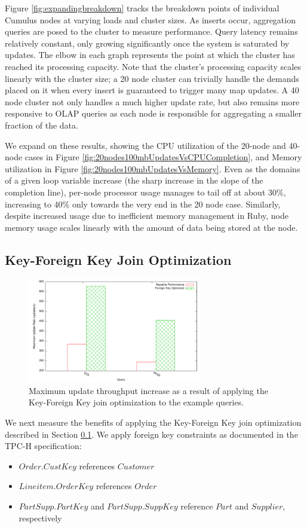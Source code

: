 Figure \ref{fig:expandingbreakdown} tracks the breakdown points of individual Cumulus nodes at varying loads and cluster sizes.  As inserts occur, aggregation queries are posed to the cluster to measure performance.  Query latency remains relatively constant, only growing significantly once the system is saturated by updates.  The elbow in each graph represents the point at which the cluster has reached its processing capacity.  Note that the cluster's processing capacity scales linearly with the cluster size; a 20 node cluster can trivially handle the demands placed on it when every insert is guaranteed to trigger many map updates.  A 40 node cluster not only handles a much higher update rate, but also remains more responsive to OLAP queries as each node is responsible for aggregating a smaller fraction of the data.

We expand on these results, showing the CPU utilization of the 20-node and 40-node cases in Figure \ref{fig:20nodes100mbUpdatesVsCPUCompletion}, and Memory utilization in Figure \ref{fig:20nodes100mbUpdatesVsMemory}.  Even as the domains of a given loop variable increase (the sharp increase in the slope of the completion line), per-node processor usage manages to tail off at about 30\%, increasing to 40\% only towards the very end in the 20 node case.  Similarly, despite increased usage due to inefficient memory management in Ruby, node memory usage scales linearly with the amount of data being stored at the node.


\subsection{Key-Foreign Key Join Optimization}
\label{sec:key_fkey}

\begin{figure}
\begin{center}
\includegraphics[width=3.0in]{images/foreignkey.pdf}
\caption{Maximum update throughput increase as a result of applying the Key-Foreign Key join optimization to the example queries.}
\label{fig:fkupdatethroughput}
\end{center}
\end{figure}
We next measure the benefits of applying the Key-Foreign Key join optimization described in Section \ref{sec:key_fkey}.  We apply foreign key constraints as documented in the TPC-H specification: 
\begin{itemize}
\item $Order.CustKey$ references $Customer$
\item $Lineitem.OrderKey$ references $Order$
\item $PartSupp.PartKey$ and $PartSupp.SuppKey$ reference $Part$ and $Supplier$, respectively

\end{itemize}

